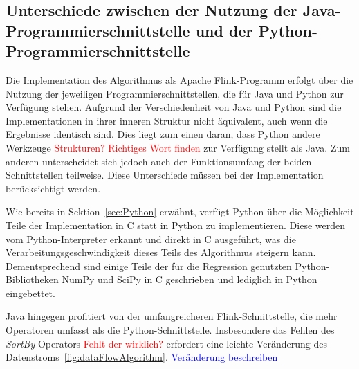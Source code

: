 \subsection{Unterschiede zwischen der Nutzung der Java-Programmierschnittstelle und der Python-Programmierschnittstelle}
\label{sec:DifferencesJavaPyFlink}
Die Implementation des Algorithmus als Apache Flink-Programm erfolgt über die Nutzung der jeweiligen Programmierschnittstellen, die für Java und Python zur Verfügung stehen. Aufgrund der Verschiedenheit von Java und Python sind die Implementationen in ihrer inneren Struktur nicht äquivalent, auch wenn die Ergebnisse identisch sind. Dies liegt zum einen daran, dass Python andere Werkzeuge \textcolor{red}{Strukturen? Richtiges Wort finden} zur Verfügung stellt als Java. Zum anderen unterscheidet sich jedoch auch der Funktionsumfang der beiden Schnittstellen teilweise. Diese Unterschiede müssen bei der Implementation berücksichtigt werden. 

Wie bereits in Sektion~\ref{sec:Python} erwähnt, verfügt Python über die Möglichkeit Teile der Implementation in C statt in Python zu implementieren. Diese werden vom Python-Interpreter erkannt und direkt in C ausgeführt, was die Verarbeitungsgeschwindigkeit dieses Teils des Algorithmus steigern kann. Dementsprechend sind einige Teile der für die Regression genutzten Python-Bibliotheken NumPy und SciPy in C geschrieben und lediglich in Python eingebettet. 

Java hingegen profitiert von der umfangreicheren Flink-Schnittstelle, die mehr Operatoren umfasst als die Python-Schnittstelle. Insbesondere das Fehlen des \textit{SortBy}-Operators \textcolor{red}{Fehlt der wirklich?} erfordert eine leichte Veränderung des Datenstroms~\ref{fig:dataFlowAlgorithm}. \textcolor{blue}{Veränderung beschreiben}


